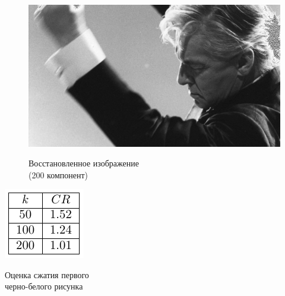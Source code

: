 \documentclass[a4paper]{article}
\begin{document}
\begin{figure}[H]
    \centering
    \caption{Восстановленное изображение \\(200 компонент)}
    \includegraphics[width = .5\textwidth]{reconstructions/with_200comps_Herbert_von_Karajan.jpg}
    \label{fig:hvk_200}
\end{figure}
\begin{table}[H]
    \centering
    \includegraphics[]{tables/CR_for_Herbert_von_Karajan.pdf}
    \caption{Оценка сжатия первого\\черно-белого рисунка}
    \label{tab:hvk}
\end{table}
\newpage
\end{document}
